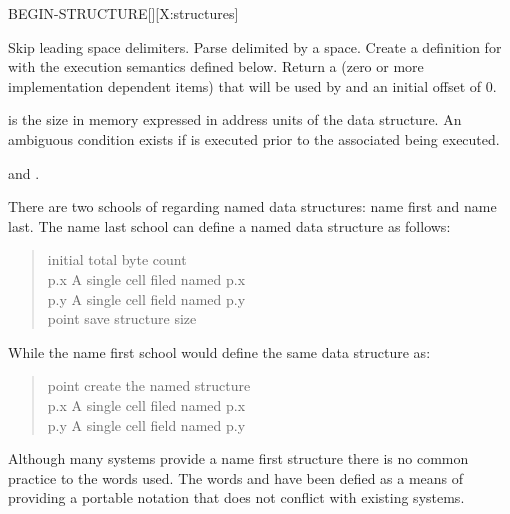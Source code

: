 \begin{worddef}{}{BEGIN-STRUCTURE}[][X:structures]
\item {}

	Skip leading space delimiters. Parse  delimited
	by a space. Create a definition for  with the
	execution semantics defined below.  Return a 
	(zero or more implementation dependent items) that will be
	used by  and an initial offset of 0.

\execute[name]

	 is the size in memory expressed in address units of
	the data structure.  An ambiguous condition exists if
	 is executed prior to the associated
	 being executed.

\see {} and
	.

	\begin{defer}
	\rationale
		There are two schools of  regarding named data
		structures: name first and name last.  The name last
		school can define a named data structure as follows:

		\begin{quote} \tab[11.5]  initial total byte count \\
		   p.x	\tab {} A single cell filed named p.x \\
		   p.y   \tab {} A single cell field named p.y \\
		 point \tab[3.8]  save structure size
		\end{quote}

		While the name first school would define the same data
		structure as:

		\begin{quote}\ttfamily
		 point \tab[-.3]  create the named structure \\
		   p.x	\tab {} A single cell filed named p.x \\
		   p.y   \tab {} A single cell field named p.y \\
		\end{quote}

		Although many systems provide a name first structure there
		is no common practice to the words used.  The words
		 and  have been
		defied as a means of providing a portable notation that does
		not conflict with existing systems.


\end{defer}
\end{worddef}
